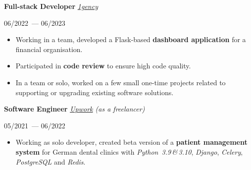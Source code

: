 \documentclass[10pt]{article}
\def\leftcolumnwidth{0.3\textwidth}
\begin{document}
\begin{minipage}[t]{\textwidth - \leftcolumnwidth - 6pt}
    \textbf{Full-stack Developer}
    \hfill
    \textit{\href{https://1gency.ee/}{1gency}}

    \vspace{1em}

    \begin{minipage}{0.25\textwidth}
        06/2022~--- 06/2023
    \end{minipage}
    \begin{minipage}{0.75\textwidth}

        \begin{itemize}[topsep=4pt,parsep=0pt,leftmargin=*]
            \item
            \raggedright
            Working in a team, developed a Flask-based \textbf{dashboard application} for a financial organisation.

            \item
            \raggedright
            Participated in \textbf{code review} to ensure high code quality.

            \item
            \raggedright
            In a team or solo, worked on a few small one-time projects related to supporting or upgrading existing software solutions.
        \end{itemize}
    \end{minipage}

    \vspace{1em}

    \textbf{Software Engineer}
    \hfill
    \textit{\href{https://upwork.com/}{Upwork} (as a freelancer)}

    \vspace{1em}

    \begin{minipage}{0.25\textwidth}
        05/2021~--- 06/2022
    \end{minipage}
    \begin{minipage}{0.75\textwidth}

        \begin{itemize}[topsep=4pt,parsep=0pt,leftmargin=*]
            \item
            \raggedright
            Working as solo developer, created beta version of a \textbf{patient management system} for German dental clinics with
            \textit{Python~3.9\,\&\,3.10}, \textit{Django}, \textit{Celery}, \textit{PostgreSQL} and \textit{Redis}.
        \end{itemize}
    \end{minipage}


\end{minipage}
\end{document}
